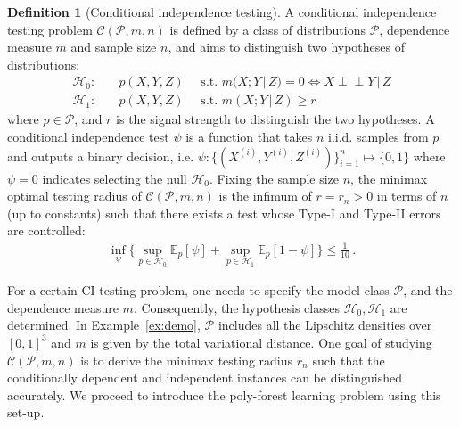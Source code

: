 \documentclass{article}
\theoremstyle{definition}
\newtheorem{definition}{Definition}
\theoremstyle{definition}
\theoremstyle{definition}
\theoremstyle{definition}
\theoremstyle{definition}
\theoremstyle{definition}
\theoremstyle{remark}
\theoremstyle{remark}
\newcommand{\E}{\mathbb{E}}
\newcommand{\st}{\text{ s.t. }}
\newcommand{\given}{\,|\,}
\newcommand{\indep}{\perp \!\!\! \perp }
\newcommand{\dpdm}{m}
\newcommand{\ciclass}{\mathcal{C}}
\newcommand{\hone}{\mathcal{H}_1}
\newcommand{\hzero}{\mathcal{H}_0}
\begin{document}
\begin{definition}[Conditional independence testing]\label{defn:problem:ci}
A conditional independence testing problem $\ciclass(\mathcal{P}, \dpdm, n)$ is defined by a class of distributions $\mathcal{P}$, dependence measure $\dpdm$ and sample size $n$,
and aims to distinguish two hypotheses of distributions:
\begin{align*}
\hzero : &\quad   p(X,Y,Z)\quad  \st \dpdm(X ; Y \given Z) =  0 \Leftrightarrow X\indep Y\given Z \\
\hone : & \quad  p(X,Y,Z)\quad  \st   \dpdm(X; Y \given Z) \ge r 
\end{align*}
where $p\in\mathcal{P}$, and $r$ is the signal strength to distinguish the two hypotheses.
A conditional independence test $\psi$ is a function that takes $n$ i.i.d. samples from $p$ and outputs a binary decision, i.e. $\psi:\{(X^{(i)},Y^{(i)},Z^{(i)})\}_{i=1}^n \mapsto \{0,1\}$ where $\psi=0$ indicates selecting the null $\hzero$. 
Fixing the sample size $n$, the minimax optimal testing radius of $\ciclass(\mathcal{P},\dpdm,n)$ is the infimum of $r=r_n>0$ in terms of $n$ (up to constants) such that there exists a test whose Type-I and Type-II errors are controlled:
\begin{align*}
    \inf_{\psi}\bigg\{\sup_{p\in \hzero}\E_p [\psi] + \sup_{p\in\hone}\E_p[1-\psi]\bigg\} \le \frac{1}{10} \,.
\end{align*}
\end{definition}
For a certain CI testing problem, one needs to specify the model class $\mathcal{P}$, and the dependence measure $\dpdm$. Consequently, the hypothesis classes $\hzero,\hone$ are determined.
In Example~\ref{ex:demo}, $\mathcal{P}$ includes all the Lipschitz densities over $[0,1]^3$ and $\dpdm$ is given by the total variational distance.
One goal of studying $\ciclass(\mathcal{P},\dpdm,n)$ is to derive the minimax testing radius $r_n$ such that the conditionally dependent and independent instances can be distinguished accurately. 
We proceed to introduce the poly-forest learning problem using this set-up. 
\end{document}
